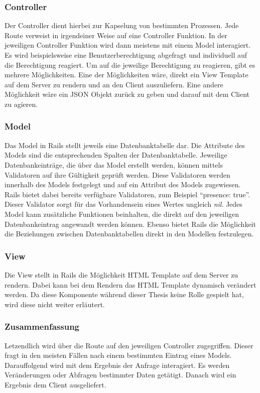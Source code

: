 \subsubsection{Controller}
\label{sec: rails_controller}
Der Controller dient hierbei zur Kapselung von bestimmten Prozessen. Jede Route verweist in irgendeiner Weise auf eine Controller Funktion. In der jeweiligen Controller Funktion wird dann meistens mit einem Model interagiert. Es wird beispielsweise eine Benutzerberechtigung abgefragt und individuell auf die Berechtigung reagiert. Um auf die jeweilige Berechtigung zu reagieren, gibt es mehrere Möglichkeiten. Eine der Möglichkeiten wäre, direkt ein View Template auf dem Server zu rendern und an den Client auszuliefern. Eine andere Möglichkeit wäre ein \gls{JSON} Objekt zurück zu geben und darauf mit dem Client zu agieren.

\subsubsection{Model}
\label{sec: rails_model}
Das Model in Rails stellt jeweils eine Datenbanktabelle dar. Die Attribute des Models sind die entsprechenden Spalten der Datenbanktabelle. Jeweilige Datenbankeinträge, die über das Model erstellt werden, können mittels Validatoren auf ihre Gültigkeit geprüft werden. Diese Validatoren werden innerhalb des Models festgelegt und auf ein Attribut des Models zugewiesen. Rails bietet dabei bereits verfügbare Validatoren, zum Beispiel \enquote{presence: true}. Dieser Validator sorgt für das Vorhandensein eines Wertes ungleich \textit{nil}. Jedes Model kann zusätzliche Funktionen beinhalten, die direkt auf den jeweiligen Datenbankeintrag angewandt werden können. Ebenso bietet Rails die Möglichkeit die Beziehungen zwischen Datenbanktabellen direkt in den Modellen festzulegen.

\subsubsection{View}
\label{sec: rails_view}
Die View stellt in Rails die Möglichkeit \gls{HTML} Template auf dem Server zu rendern. Dabei kann bei dem Rendern das \gls{HTML} Template dynamisch verändert werden. Da diese Komponente während dieser Thesis keine Rolle gespielt hat, wird diese nicht weiter erläutert.

\subsubsection{Zusammenfassung}
\label{sec: rails_resuemee}
Letzendlich wird über die Route auf den jeweiligen Controller zugegriffen. Dieser fragt in den meisten Fällen nach einem bestimmten Eintrag eines Models. Darauffolgend wird mit dem Ergebnis der Anfrage interagiert. Es werden Veränderungen oder Abfragen bestimmter Daten getätigt. Danach wird ein Ergebnis dem Client ausgeliefert.


